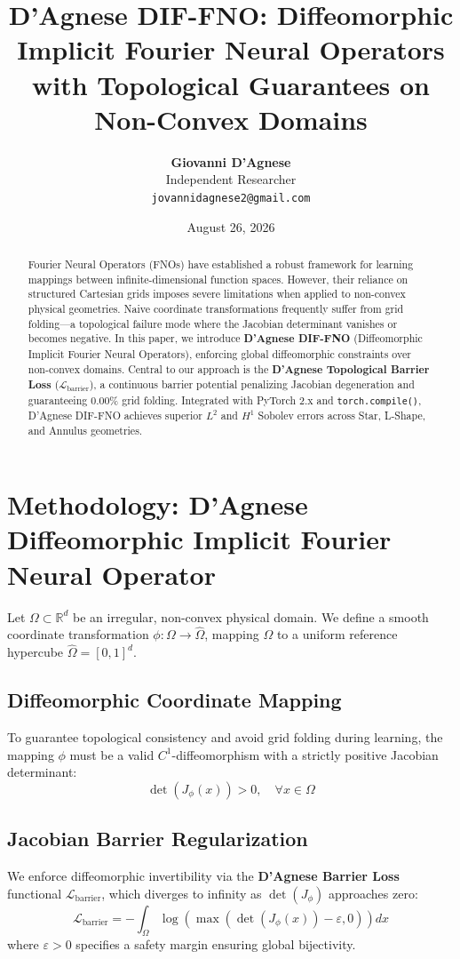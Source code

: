 \documentclass[11pt,a4paper]{article}
\title{\textbf{D'Agnese DIF-FNO: Diffeomorphic Implicit Fourier Neural Operators with Topological Guarantees on Non-Convex Domains}}
\author{\textbf{Giovanni D'Agnese} \\ Independent Researcher \\ \texttt{jovannidagnese2@gmail.com}}
\date{August 26, 2026}
\begin{document}
\maketitle

\begin{abstract}
Fourier Neural Operators (FNOs) have established a robust framework for learning mappings between infinite-dimensional function spaces. However, their reliance on structured Cartesian grids imposes severe limitations when applied to non-convex physical geometries. Naive coordinate transformations frequently suffer from grid folding—a topological failure mode where the Jacobian determinant vanishes or becomes negative. In this paper, we introduce \textbf{D'Agnese DIF-FNO} (Diffeomorphic Implicit Fourier Neural Operators), enforcing global diffeomorphic constraints over non-convex domains. Central to our approach is the \textbf{D'Agnese Topological Barrier Loss} ($\mathcal{L}_{\text{barrier}}$), a continuous barrier potential penalizing Jacobian degeneration and guaranteeing 0.00\% grid folding. Integrated with PyTorch 2.x and \texttt{torch.compile()}, D'Agnese DIF-FNO achieves superior $L^2$ and $H^1$ Sobolev errors across Star, L-Shape, and Annulus geometries.
\end{abstract}

\section{Methodology: D'Agnese Diffeomorphic Implicit Fourier Neural Operator}
\label{sec:theory}

Let $\Omega \subset \mathbb{R}^d$ be an irregular, non-convex physical domain. We define a smooth coordinate transformation $\phi: \Omega \to \hat{\Omega}$, mapping $\Omega$ to a uniform reference hypercube $\hat{\Omega} = [0,1]^d$.

\subsection{Diffeomorphic Coordinate Mapping}
To guarantee topological consistency and avoid grid folding during learning, the mapping $\phi$ must be a valid $C^1$-diffeomorphism with a strictly positive Jacobian determinant:
\begin{equation}
\det(J_\phi(x)) > 0, \quad \forall x \in \Omega
\end{equation}

\subsection{Jacobian Barrier Regularization}
We enforce diffeomorphic invertibility via the \textbf{D'Agnese Barrier Loss} functional $\mathcal{L}_{\text{barrier}}$, which diverges to infinity as $\det(J_\phi)$ approaches zero:
\begin{equation}
\mathcal{L}_{\text{barrier}} = -\int_{\Omega} \log \left( \max( \det(J_\phi(x)) - \varepsilon, 0 ) \right) dx
\end{equation}
where $\varepsilon > 0$ specifies a safety margin ensuring global bijectivity.
\end{document}
